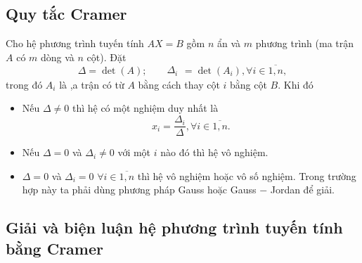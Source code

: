 \subsection{Quy tắc Cramer}
\begin{mybox}
\begin{theorem}
Cho hệ phương trình tuyến tính $AX = B$ gồm $n$ ẩn và $m$ phương trình (ma trận $A$ có $m$ dòng và $n$ cột). Đặt
$$\Delta  = \det \left( A \right);\begin{array}{*{20}{c}}
  {}&{}&{{\Delta _i}} 
\end{array} = \det \left( {{A_i}} \right),\forall i \in \overline {1,n} ,$$
trong đó $A_i$ là ,a trận có từ $A$ bằng cách thay cột $i$ bằng cột $B.$ Khi đó
\begin{itemize}
\item Nếu $\Delta \ne 0$ thì hệ có một nghiệm duy nhất là
$${x_i} = \frac{{{\Delta _i}}}{\Delta },\forall i \in \overline {1,n} .$$
\item Nếu $\Delta = 0$ và $\Delta_i \ne 0$ với một $i$ nào đó thì hệ vô nghiệm.
\item $\Delta = 0$ và $\Delta_i = 0$ $\forall i \in \overline {1,n} $ thì hệ vô nghiệm hoặc vô số nghiệm. Trong trường hợp này ta phải dùng phương pháp Gauss hoặc Gauss $-$ Jordan để giải.
\end{itemize}
\end{theorem}
\end{mybox}
\subsection{Giải và biện luận hệ phương trình tuyến tính bằng Cramer}